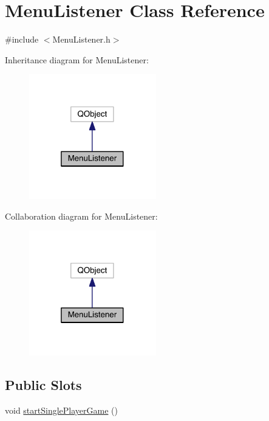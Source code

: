 \hypertarget{class_menu_listener}{\section{Menu\+Listener Class Reference}
\label{class_menu_listener}
}


{\ttfamily \#include $<$Menu\+Listener.\+h$>$}



Inheritance diagram for Menu\+Listener\+:\nopagebreak
\begin{figure}[H]
\begin{center}
\leavevmode
\includegraphics[width=157pt]{class_menu_listener__inherit__graph}
\end{center}
\end{figure}


Collaboration diagram for Menu\+Listener\+:\nopagebreak
\begin{figure}[H]
\begin{center}
\leavevmode
\includegraphics[width=157pt]{class_menu_listener__coll__graph}
\end{center}
\end{figure}
\subsection*{Public Slots}
\begin{DoxyCompactItemize}
\item 
void \hyperlink{class_menu_listener_a1d6f62c6f9d05b0e09c65effca0355f7}{start\+Single\+Player\+Game} ()
\end{DoxyCompactItemize}
